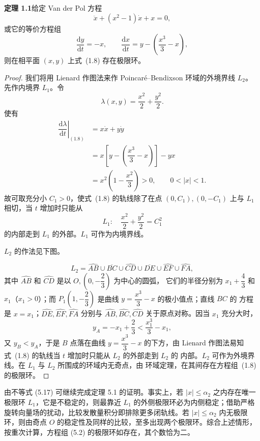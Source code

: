 \noindent\textbf{定理 1.1}\quad 给定 Van der Pol 方程
\[
  \ddot{x}+(x^2-1)\dot{x}+x=0, \tag{1.7}
\]
或它的等价方程组
\[
  \dfrac{\mathrm{d}y}{\mathrm{d}t}=-x,\qquad
  \dfrac{\mathrm{d}x}{\mathrm{d}t}=y-\left(\dfrac{x^3}{3}-x\right), \tag{1.8}
\]
则在相平面 $(x,y)$ 上式~(1.8) 存在极限环。

\begin{proof}
我们将用 Lienard 作图法来作 Poincar\'e--Bendixson 环域的外境界线 $L_2$。
先作内境界 $L_1$。令
\[
  \lambda(x,y)=\dfrac{x^2}{2}+\dfrac{y^2}{2}.
\]
使有
\[
\begin{aligned}
  \left.\dfrac{\mathrm{d}\lambda}{\mathrm{d}t}\right|_{(1.8)}
  &=x\dot{x}+y\dot{y}\\
  &=x\left[y-\left(\dfrac{x^3}{3}-x\right)\right]-yx\\
  &=x^2\left(1-\dfrac{x^2}{3}\right)>0,\qquad 0<|x|<1.
\end{aligned}
\]
故可取充分小 $C_1>0$，使式~(1.8) 的轨线除了在点
$(0,C_1),(0,-C_1)$ 上与 $L_1$ 相切，当 $t$ 增加时只能从
\[
  L_1:\quad \dfrac{x^2}{2}+\dfrac{y^2}{2}=C_1^2
\]
的内部走到 $L_1$ 的外部。$L_1$ 可作为内境界线。

$L_2$ 的作法见下图。


\[
  L_2=\widehat{AB}\cup\overline{BC}\cup\widehat{CD}
  \cup\overline{DE}\cup\widehat{EF}\cup\widehat{FA},
\]
其中 $\widehat{AB}$ 和 $\widehat{CD}$ 是以 $O,(0,-\dfrac23)$ 为中心的圆弧，
它们的半径分别为 $x_1+\dfrac43$ 和 $x_1$（$x_1>0$）；而
$P_1(1,-\dfrac23)$ 是曲线 $y=\dfrac{x^3}{3}-x$ 的极小值点；直线 $BC$ 的
方程是 $x=x_1$；$\widehat{DE},\widehat{EF},\widehat{FA}$ 分别与
$\widehat{AB},\widehat{BC},\widehat{CD}$ 关于原点对称。因当 $x_1$ 充分大时，
\[
  y_A=-x_1+\dfrac23<\dfrac{x_1^3}{3}-x_1,
\]
又 $y_B<y_A$，于是 $B$ 点落在曲线 $y=\dfrac{x^3}{3}-x$ 的下方，由 Lienard
作图法易知式~(1.8) 的轨线当 $t$ 增加时只能从 $L_2$ 的外部走到 $L_2$ 的
内部。$L_2$ 可作为外境界线。在 $L_1$ 与 $L_2$ 所围成的环域内无奇点，由
环域定理，在其间存在方程组~(1.8) 的极限环。\qedhere
\end{proof}

\iffalse
由不等式 (5.17) 可继续完成定理 5.1 的证明。事实上，若 $|x|\leqslant\alpha_2$ 之内存在唯一极限环 $L_1$，它是不稳定的，则最靠近 $L_1$ 的外侧极限环必为内侧稳定；借助严格旋转向量场的扰动，比较发散量积分即排除更多闭轨线。若 $|x|\leqslant\alpha_2$ 内无极限环，则由奇点 $O$ 的稳定性及同样的比较，至多出现两个极限环。综合上述情形，按重次计算，方程组 (5.2) 的极限环如存在，其个数恰为二。


